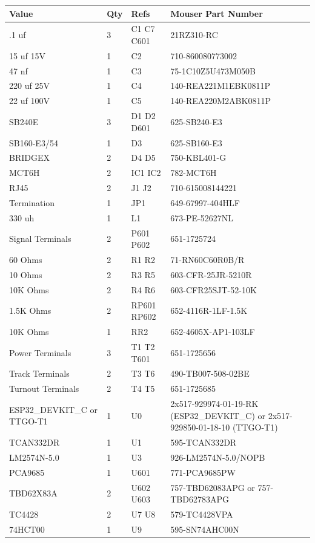 \begin{centering}\begin{tabular}{|p{1.75in}|l|l|p{2.75in}|}
\hline  
Value&Qty&Refs&Mouser Part Number\\
\hline  
.1 uf&3&C1 C7 C601&21RZ310-RC\\
\hline  
15 uf 15V&1&C2&710-860080773002\\
\hline  
47 nf&1&C3&75-1C10Z5U473M050B\\
\hline  
220 uf 25V&1&C4&140-REA221M1EBK0811P\\
\hline  
22 uf 100V&1&C5&140-REA220M2ABK0811P\\
\hline  
SB240E&3&D1 D2 D601&625-SB240-E3\\
\hline  
SB160-E3/54&1&D3&625-SB160-E3\\
\hline  
BRIDGEX&2&D4 D5&750-KBL401-G\\
\hline  
MCT6H&2&IC1 IC2&782-MCT6H\\
\hline  
RJ45&2&J1 J2&710-615008144221\\
\hline  
Termination&1&JP1&649-67997-404HLF\\
\hline  
330 uh&1&L1&673-PE-52627NL\\
\hline  
Signal Terminals&2&P601 P602&651-1725724\\
\hline  
60 Ohms&2&R1 R2&71-RN60C60R0B/R\\
\hline  
10 Ohms&2&R3 R5&603-CFR-25JR-5210R\\
\hline  
10K Ohms&2&R4 R6&603-CFR25SJT-52-10K\\
\hline  
1.5K Ohms&2&RP601 RP602&652-4116R-1LF-1.5K\\
\hline  
10K Ohms&1&RR2&652-4605X-AP1-103LF\\
\hline  
Power Terminals&3&T1 T2 T601&651-1725656\\
\hline  
Track Terminals&2&T3 T6&490-TB007-508-02BE\\
\hline  
Turnout Terminals&2&T4 T5&651-1725685\\
\hline  
ESP32\_DEVKIT\_C or TTGO-T1&1&U0&2x517-929974-01-19-RK (ESP32\_DEVKIT\_C) or 2x517-929850-01-18-10 (TTGO-T1)\\
\hline  
TCAN332DR&1&U1&595-TCAN332DR\\
\hline  
LM2574N-5.0&1&U3&926-LM2574N-5.0/NOPB\\
\hline  
PCA9685&1&U601&771-PCA9685PW\\
\hline  
TBD62X83A&2&U602 U603&757-TBD62083APG or 757-TBD62783APG\\
\hline  
TC4428&2&U7 U8&579-TC4428VPA\\
\hline  
74HCT00&1&U9&595-SN74AHC00N\\
\hline  
\end{tabular}
\end{centering}

